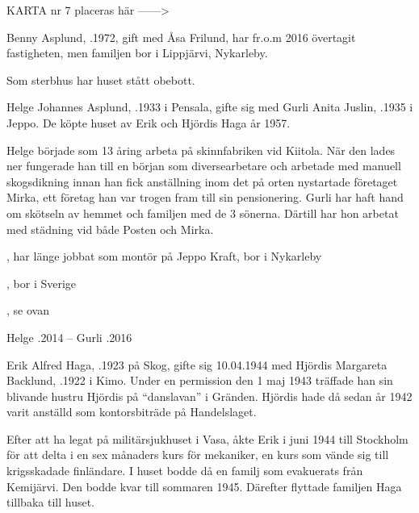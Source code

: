 
KARTA nr 7 placeras här ------>



Benny Asplund, .1972, gift med Åsa Frilund, har fr.o.m 2016 övertagit fastigheten, men familjen bor i Lippjärvi, Nykarleby.


Som sterbhus har huset stått obebott.


Helge Johannes Asplund, .1933 i Pensala, gifte sig med Gurli Anita Juslin, .1935 i Jeppo. De köpte huset av Erik och Hjördis Haga år 1957.

Helge började som 13 åring arbeta på skinnfabriken vid Kiitola. När den lades ner fungerade han till en början som diversearbetare och arbetade med manuell skogsdikning innan han fick anställning inom det på orten nystartade företaget Mirka, ett företag han var trogen fram till sin pensionering. Gurli har haft hand om skötseln av hemmet och familjen med de 3 sönerna. Därtill har hon arbetat med städning vid både Posten och Mirka.


\begin{jhchildren}
  \item {}, har länge jobbat som montör på Jeppo Kraft, bor i Nykarleby
  \item {}, bor i Sverige
  \item {}, se ovan
\end{jhchildren}

Helge .2014  --  Gurli .2016


Erik Alfred Haga, .1923 på Skog, gifte sig 10.04.1944 med Hjördis Margareta Backlund, .1922 i Kimo. Under en permission den 1 maj 1943 träffade han sin blivande hustru Hjördis på ``danslavan'' i Gränden. Hjördis hade då sedan år 1942 varit anställd som kontorsbiträde på Handelslaget.

Efter att ha legat på militärsjukhuset i Vasa, åkte Erik i juni 1944 till Stockholm för att delta i en sex månaders kurs för mekaniker, en kurs som vände sig till krigsskadade finländare. I huset bodde då en familj som evakuerats från Kemijärvi. Den bodde kvar till sommaren 1945. Därefter flyttade familjen Haga tillbaka till huset.

